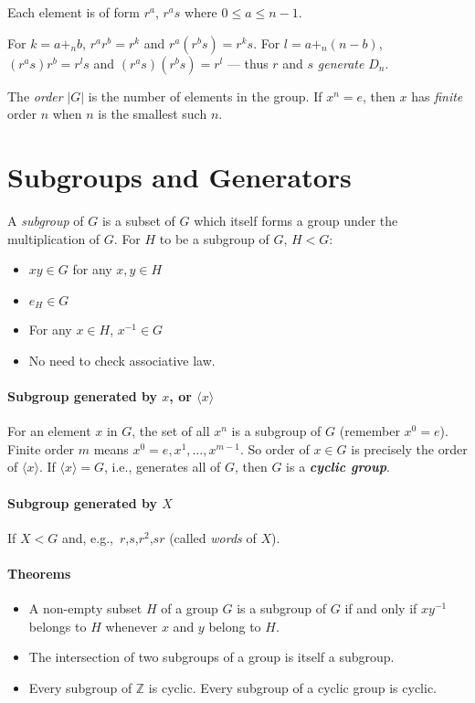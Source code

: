 \documentclass[a4paper,twocolumn,10pt]{article}
\begin{document}
  Each element is of form $r^a$, $r^as$ where $0\leqslant a\leqslant n-1$.

  For $k=a+_nb$, $r^ar^b=r^k$ and $r^a(r^bs)=r^ks$.  For $l=a+_n(n-b)$,
  $(r^as)r^b=r^ls$ and $(r^as)(r^bs)=r^l$ --- thus $r$ and $s$
  \textit{generate} $D_n$.

  The \textit{order} $|G|$ is the number of elements in the group. If $x^n=e$,
  then $x$ has \textit{finite} order $n$ when $n$ is the smallest such $n$.

  \section{Subgroups and Generators}
  A \textit{subgroup} of $G$ is a subset of $G$ which itself forms a group
  under the multiplication of $G$. For $H$ to be a subgroup of $G$, $H<G$:
  \begin{itemize}
    \item $xy \in G$ for any $x,y \in H$
    \item $e_H \in G$
    \item For any $x \in H$, $x^{-1} \in G$
    \item No need to check associative law.
  \end{itemize}

  \paragraph{Subgroup generated by $x$, or $\langle x \rangle$}
  For an element $x$ in $G$, the set of all $x^n$ is a subgroup of $G$
  (remember $x^0=e$). Finite order $m$ means $x^0=e, x^1, \ldots, x^{m-1}$.
  So order of $x\in G$ is precisely the order of $\langle x\rangle$. If
  $\langle x\rangle=G$, i.e., generates all of $G$, then $G$ is a
  \textbf{\textit{cyclic group}}.

  \paragraph{Subgroup generated by $X$} If $X<G$ and, e.g.,~$r$,$s$,$r^2$,$sr$
  (called \textit{words} of $X$).

  \paragraph{Theorems}
  \begin{itemize}
    \item A non-empty subset $H$ of a group $G$ is a subgroup of $G$ if and
      only if $xy^{-1}$ belongs to $H$ whenever $x$ and $y$ belong to $H$.
    \item The intersection of two subgroups of a group is itself a subgroup.
    \item Every subgroup of $\mathbb{Z}$ is cyclic. Every subgroup of a cyclic
      group is cyclic.
  \end{itemize}
\end{document}
